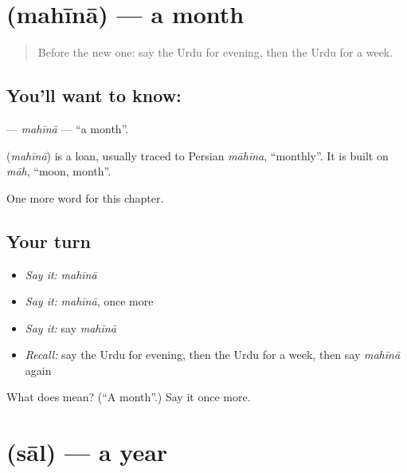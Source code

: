 \section[\texorpdfstring{\ur{مہینہ} (mahīnā)}{مہینہ (mahīnā)}]{ (mahīnā) — a month}

\label{lesson:UR-C75-mahina}



\begin{quote}
Before the new one: say the Urdu for evening, then the Urdu for a week.
\end{quote}

\subsection*{You'll want to know: }
\textbf{} — \emph{mahīnā} — \textquotedblleft{}a month\textquotedblright{}.

\begin{cousinweb}
\textbf{} (\emph{mahīnā}) is a loan, usually traced to Persian \emph{māhīna}, \textquotedblleft{}monthly\textquotedblright{}. It is built on \emph{māh}, \textquotedblleft{}moon, month\textquotedblright{}.
\end{cousinweb}

\begin{grammarlens}[title={What you've built}]
One more word for this chapter.
\end{grammarlens}

\subsection*{Your turn}
\begin{itemize}
\raggedright
  \item \emph{Say it:} \emph{mahīnā}
  \item \emph{Say it:} \emph{mahīnā}, once more
  \item \emph{Say it:} say \emph{mahīnā}
  \item \emph{Recall:} say the Urdu for evening, then the Urdu for a week, then say \emph{mahīnā} again
\end{itemize}

\begin{tcolorbox}[breakable,colback=teal!4,colframe=teal!35!black,title={Before you move on}]
What does  mean? (\textquotedblleft{}A month\textquotedblright{}.) Say it once more.
\end{tcolorbox}
\section[\texorpdfstring{\ur{سال} (sāl)}{سال (sāl)}]{ (sāl) — a year}

